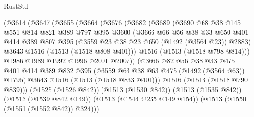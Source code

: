 \begin{lexlean}{RustStd}
\begin{coremodule}
                  (@3614
                    (@3647
                      (@3655
                        (@3664
                          (@3676
                            (@3682
                              (@3689
                                (@3690
                                  @68
                                  @38
                                  @145
                                  @551
                                  @814
                                  @821
                                  @389
                                  @797
                                  @395
                                  @3600
                                  (@3666
                                    @66
                                    @56
                                    @38
                                    @33
                                    @650
                                    @401
                                    @414
                                    @389
                                    @807
                                    @395
                                    (@3559 @23 @38 @23 @650 (@1492 (@3564 @23)) @2883)
                                    @3643
                                    @1516
                                    (@1513 (@1518 @808 @401)))
                                  @1516
                                  (@1513 (@1518 @798 @814)))
                                @1986
                                @1989
                                @1992
                                @1996
                                @2001
                                @2007))
                            (@3666
                              @82
                              @56
                              @38
                              @33
                              @475
                              @401
                              @414
                              @389
                              @832
                              @395
                              (@3559 @63 @38 @63 @475 (@1492 (@3564 @63)) @1795)
                              @3643
                              @1516
                              (@1513 (@1518 @833 @401)))
                            @1516
                            (@1513 (@1518 @790 @839)))
                          (@1525 (@1526 @842))
                          (@1513 (@1530 @842))
                          (@1513 (@1535 @842))
                          (@1513 (@1539 @842 @149))
                          (@1513 (@1544 @235 @149 @154))
                          (@1513 (@1550 (@1551 (@1552 @842)) @324)))

\end{coremodule}
\end{lexlean}
